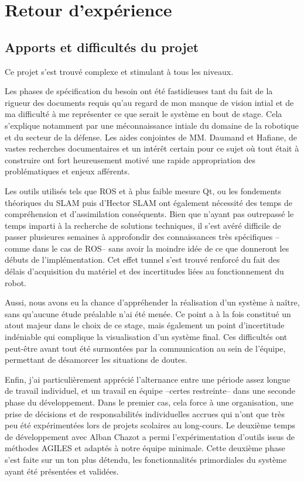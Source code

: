 \section{Retour d'expérience}
  \subsection{Apports et difficultés du projet}
  
  Ce projet s'est trouvé complexe et stimulant à tous les niveaux. 
  
  Les phases de spécification du besoin ont été fastidieuses tant du fait de la rigueur des documents requis qu'au regard de mon manque de vision intial et de ma difficulté à me représenter ce que serait le système en bout de stage. 
  Cela s'explique notamment par une méconnaissance intiale du domaine de la robotique et du secteur de la défense.
  Les aides conjointes de MM. Daumand et Hafiane, de vastes recherches documentaires et un intérêt certain pour ce sujet où tout était à construire ont fort heureusement motivé une rapide appropriation des problématiques et enjeux afférents. 
  
  Les outils utilisés tels que ROS et à plus faible mesure Qt, ou les fondements théoriques du SLAM puis d'Hector SLAM ont également nécessité des temps de compréhension et d'assimilation conséquents. 
  Bien que n'ayant pas outrepassé le temps imparti à la recherche de solutions techniques, il s'est avéré difficile de passer plusieures semaines à approfondir des connaissances très spécifiques --comme dans le cas de ROS-- sans 
  avoir la moindre idée de ce que donneront les débuts de l'implémentation. 
  Cet effet tunnel s'est trouvé renforcé du fait des délais d'acquisition du matériel et des incertitudes liées au fonctionnement du robot. 
  
  Aussi, nous avons eu la chance d'appréhender la réalisation d'un système à naître, sans qu'aucune étude préalable n'ai été menée. 
  Ce point a à la fois constitué un atout majeur dans le choix de ce stage, mais également un point d'incertitude indéniable qui complique la visualisation d'un système final. 
  Ces difficultés ont peut-être avant tout été surmontées par la communication au sein de l'équipe, permettant de désamorcer les situations de doutes. 
  
  Enfin, j'ai particulièrement apprécié l'alternance entre une période assez longue de travail individuel, et un travail en équipe --certes restreinte-- dans une seconde phase du développement. 
  Dans le premier cas, cela force à une organisation, une prise de décisions et de responsabilités individuelles accrues qui n'ont que très peu été expérimentées lors de projets scolaires au long-cours.
  Le deuxième temps de développement avec Alban Chazot a permi l'expérimentation d'outils issus de méthodes AGILES et adaptés à notre équipe minimale.  
  Cette deuxième phase s'est faite sur un ton plus détendu, les fonctionnalités primordiales du système ayant été présentées et validées. 
  
